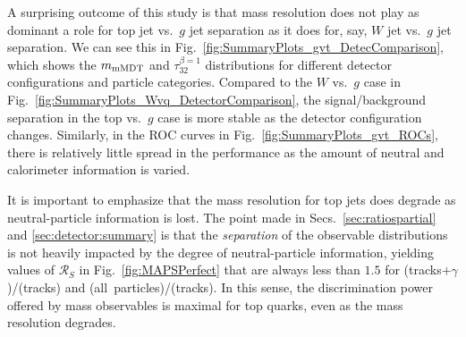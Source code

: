 \documentclass[11pt,letterpaper]{article}
\DeclareRobustCommand{\Secs}[2]{Secs.~\ref{#1} and \ref{#2}}
\DeclareRobustCommand{\Fig}[1]{Fig.~\ref{#1}}
\newcommand{\pt}{p_{\mathrm{T}}}
\begin{document}
A surprising outcome of this study is that mass resolution does not play as dominant a role for top jet vs.~$g$ jet separation as it does for, say, $W$ jet vs.~$g$ jet separation.
%
We can see this in \Fig{fig:SummaryPlots_gvt_DetecComparison}, which shows the $m_{\rm mMDT}$ and $\tau_{32}^{\beta=1}$ distributions for different detector configurations and particle categories.
%
Compared to the $W$ vs.~$g$ case in \Fig{fig:SummaryPlots_Wvq_DetectorComparison}, the signal/background separation in the top vs.~$g$ case is more stable as the detector configuration changes.
%
Similarly, in the ROC curves in \Fig{fig:SummaryPlots_gvt_ROCs}, there is relatively little spread in the performance as the amount of neutral and calorimeter information is varied. 

It is important to emphasize that the mass resolution for top jets does degrade as neutral-particle information is lost.
%
The point made in \Secs{sec:ratiospartial}{sec:detector:summary} is that the \emph{separation} of the observable distributions is not heavily impacted by the degree of neutral-particle information, yielding values of $\mathcal{R}_S$ in \Fig{fig:MAPSPerfect} that are always less than $1.5$ for (tracks$+\gamma$)/(tracks) and (all~particles)/(tracks).
%
In this sense, the discrimination power offered by mass observables is maximal for top quarks, even as the mass resolution degrades.



\end{document}
